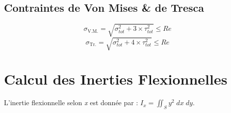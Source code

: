 \documentclass[a4paper]{article}
\begin{document}
\subsection{Contraintes de Von Mises \& de Tresca}




\[ \sigma_{\text{V.M.}} = \sqrt{\sigma_{tot}^2 + 3 \times \tau_{tot}^2} \leq Re \]
\[ \sigma_{\text{Tr.}} = \sqrt{\sigma_{tot}^2 + 4 \times \tau_{tot}^2} \leq Re \]










\section{Calcul des Inerties Flexionnelles}





L'inertie flexionnelle selon \emph{x} est donnée par : $\displaystyle I_x = \iint_S y^2 \; d x \; d y $.
\end{document}
